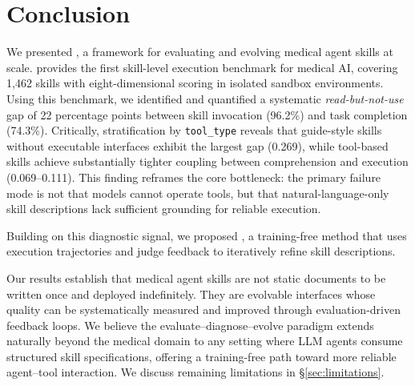 \section{Conclusion}
\label{sec:conclusion}

We presented \medskille, a framework for evaluating and evolving medical agent skills at scale.
\medskillbench provides the first skill-level execution benchmark for medical AI, covering 1,462 skills with eight-dimensional scoring in isolated sandbox environments.
Using this benchmark, we identified and quantified a systematic \emph{read-but-not-use} gap of 22 percentage points between skill invocation (96.2\%) and task completion (74.3\%).
Critically, stratification by \texttt{tool\_type} reveals that guide-style skills without executable interfaces exhibit the largest gap (0.269), while tool-based skills achieve substantially tighter coupling between comprehension and execution (0.069--0.111).
This finding reframes the core bottleneck: the primary failure mode is not that models cannot operate tools, but that natural-language-only skill descriptions lack sufficient grounding for reliable execution.

Building on this diagnostic signal, we proposed \gepamed, a training-free method that uses execution trajectories and judge feedback to iteratively refine skill descriptions.

Our results establish that medical agent skills are not static documents to be written once and deployed indefinitely.
They are evolvable interfaces whose quality can be systematically measured and improved through evaluation-driven feedback loops.
We believe the evaluate--diagnose--evolve paradigm extends naturally beyond the medical domain to any setting where LLM agents consume structured skill specifications, offering a training-free path toward more reliable agent--tool interaction.
We discuss remaining limitations in \S\ref{sec:limitations}.
